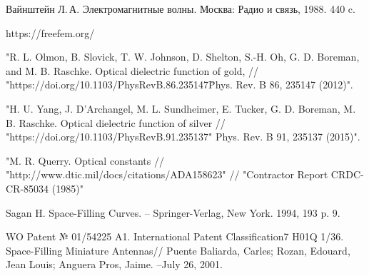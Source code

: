 \documentclass[%
specialist,  %
subf,        %
href,        %
colorlinks,  %
]{disser}
\begin{document}
\begin{thebibliography}{99}
	Вайнштейн Л.\,А. {Электромагнитные волны}. Москва: Радио и связь, 1988. 440 c.
	
 https://freefem.org/
	
 "R. L. Olmon, B. Slovick, T. W. Johnson, D. Shelton, S.-H. Oh, G. D. Boreman, and M. B. Raschke. Optical dielectric function of gold, // "https://doi.org/10.1103/PhysRevB.86.235147\" Phys. Rev. B 86, 235147 (2012)".
	
"H. U. Yang, J. D'Archangel, M. L. Sundheimer, E. Tucker, G. D. Boreman, M. B. Raschke. Optical dielectric function of silver // "https://doi.org/10.1103/PhysRevB.91.235137" Phys. Rev. B 91, 235137 (2015)".
	
"M. R. Querry. Optical constants //  "http://www.dtic.mil/docs/citations/ADA158623" // "Contractor Report CRDC-CR-85034 (1985)"
	
 Sagan H. Space-Filling Curves. – Springer-Verlag, New York. 1994, 193 p. 9. 

 WO Patent № 01/54225 A1. International Patent Classification7 H01Q 1/36. Space-Filling Miniature Antennas// Puente Baliarda, Carles; Rozan, Edouard, Jean Louis; Anguera Pros, Jaime. –July 26, 2001.
	
\end{thebibliography}

%
\end{document}
